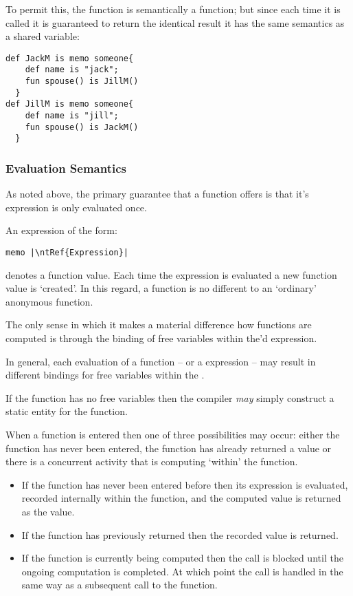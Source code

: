 To permit this, the  function is semantically a function; but since each time it is called it is guaranteed to return the identical result it has the same semantics as a shared variable:
\begin{lstlisting}
def JackM is memo someone{
    def name is "jack";
    fun spouse() is JillM()
  }
def JillM is memo someone{
    def name is "jill";
    fun spouse() is JackM()
  }
\end{lstlisting}

\subsubsection{Evaluation Semantics}
As noted above, the primary guarantee that a  function offers is that it's expression is only evaluated once.

An expression of the form:
\begin{lstlisting}[escapechar=|]
memo |\ntRef{Expression}|
\end{lstlisting}
denotes a function value. Each time the  expression is evaluated a new function value is `created'. In this regard, a  function is no different to an `ordinary' anonymous function.

\begin{aside}
The only sense in which it makes a material difference how  functions are computed is through the binding of free variables within the'd expression.

In general, each evaluation of a  function -- or a  expression -- may result in different bindings for free variables within the .

If the function has no free variables then the compiler \emph{may} simply construct a static entity for the function.
\end{aside}

When a  function is entered then one of three possibilities may occur: either the  function has never been entered, the  function has already returned a value or there is a concurrent activity that is computing `within' the function.

\begin{itemize}
\item If the  function has never been entered before then its expression is evaluated, recorded internally within the function, and the computed value is returned as the value.
\item If the  function has previously returned then the recorded value is returned.
\item If the  function is currently being computed then the call is blocked until the ongoing computation is completed. At which point the call is handled in the same way as a subsequent call to the  function.
\end{itemize}

